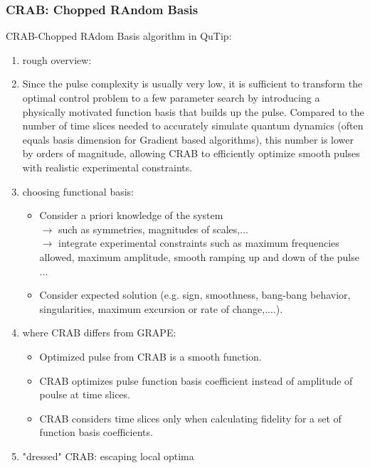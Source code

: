 \documentclass{article}
\begin{document}
\subsubsection{CRAB: Chopped RAndom Basis}
CRAB-Chopped RAdom Basis algorithm in QuTip: 
\begin{enumerate}
    \item rough overview: 
    \item Since the pulse complexity is usually very low, it is sufficient to transform the optimal control problem to a few parameter search by introducing a physically motivated function basis that builds up the pulse. 
        Compared to the number of time slices needed to accurately simulate quantum dynamics (often equals basis dimension for Gradient based algorithms), this number is lower by orders of magnitude, 
        allowing CRAB to efficiently optimize smooth pulses with realistic experimental constraints. 
    \item choosing functional basis: 
        \begin{itemize}
            \item Consider a priori knowledge of the system \\
                $\rightarrow$ such as symmetries, magnitudes of scales,... \\
                $\rightarrow$ integrate experimental constraints such as maximum frequencies allowed, maximum amplitude, smooth ramping up and down of the pulse ...
            \item Consider expected solution (e.g. sign, smoothness, bang-bang behavior, singularities, maximum excursion or rate of change,....).
        \end{itemize}
    \item where CRAB differs from GRAPE: 
        \begin{itemize}
            \item Optimized pulse from CRAB is a smooth function.
            \item CRAB optimizes pulse function basis coefficient instead of amplitude of poulse at time slices.
            \item CRAB considers time slices only when calculating fidelity for a set of function basis coefficients. 
        \end{itemize}
    \item "dressed" CRAB: escaping local optima
\end{enumerate}

\end{document}
